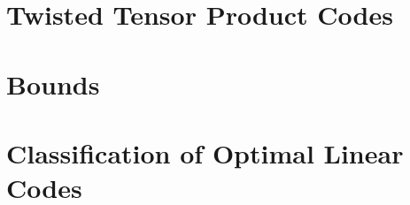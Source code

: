 


\clearpage

\section{Twisted Tensor Product Codes}
\label{sec:TTP:codes}






\clearpage

\section{Bounds}
\label{sec:Bounds}






\clearpage

\section{Classification of Optimal Linear Codes}
\label{sec:coding:classification}






\clearpage
